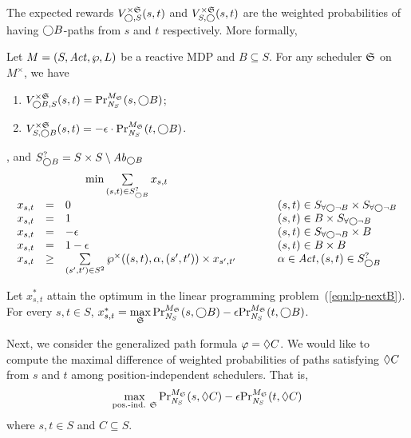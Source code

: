 The expected rewards ${V}_{\gX, S}^{\times\scheduler{S}} (s, t)$ and
${V}_{S, \gX}^{\times\scheduler{S}} (s, t)$ are the weighted
probabilities of having $\gX B$-paths from $s$ and $t$
respectively. More formally,
\begin{proposition}
  \label{proposition:joint-probabilities}
  Let $M = (S, \Act, \wp, L)$ be a reactive MDP and $B \subseteq S$.
  For any scheduler $\scheduler{S}$ on $M^{\times}$, we have
  \begin{enumerate}
  \item ${V}_{\gX B, S}^{\times\scheduler{S}} (s, t) = 
    \myPr{s}{M_{\scheduler{S}}}{\neighbor{S}}{\gX B}$;
  \item ${V}_{S, \gX B}^{\times\scheduler{S}} (s, t) =  
    -\epsilon \cdot \myPr{t}{M_{\scheduler{S}}}{\neighbor{S}}{\gX B}$.
  \end{enumerate}
\end{proposition}

, and $S^{?}_{\gX B} = S
\times S \setminus \mathit{Ab}_{\gX B}$
\begin{eqnarray}
  \label{eqn:lp-nextB}
\begin{array}{rclll}
  \multicolumn{3}{c}{
  \min \sum\limits_{(s, t) \in {S}^{?}_{\gX B}} x_{s, t}
  }\\
  x_{s, t} & = & 0 & \hspace{.05\columnwidth} &
  (s, t) \in \nevernextB \times \nevernextB \\
  x_{s, t} & = & 1 && 
  (s, t) \in B \times \nevernextB\\
  x_{s, t} & = & - \epsilon &&
  (s, t) \in \nevernextB \times B\\
  x_{s, t} & = & 1 - \epsilon && 
  (s, t) \in B \times B\\
  x_{s, t} &\geq& 
  \sum\limits_{(s', t') \in {S}^{2}}
   \wp^{\times} ((s, t), \alpha, (s', t')) \times x_{s', t'} 
  &&
  \alpha \in \Act, (s, t) \in {S}^{?}_{\gX B}
\end{array}
\end{eqnarray}

\begin{theorem}
  Let $x^*_{s, t}$ attain the optimum in the linear programming
  problem~(\ref{eqn:lp-nextB}). For every $s, t \in S$, 
  $x^*_{s, t} = \max\limits_{\scheduler{S}}
  \myPr{s}{M_{\scheduler{S}}}{\neighbor{S}}{\gX B} - 
  \epsilon \myPr{t}{M_{\scheduler{S}}}{\neighbor{S}}{\gX B}$.  
  \label{theorem:nextC}
\end{theorem}

Next, we consider the generalized path formula $\varphi = \gF C$. We
would like to compute the maximal difference of weighted probabilities
of paths satisfying $\gF C$ from $s$ and $t$ among
position-independent schedulers. That is, 
\begin{eqnarray}
  \label{eqn:max-eventuallyC}
\max_{\textmd{pos.-ind. } \scheduler{S}} 
\myPr{s}{M_{\scheduler{S}}}{\neighbor{S}}{\gF C} -
\epsilon \myPr{t}{M_{\scheduler{S}}}{\neighbor{S}}{\gF C}
\end{eqnarray}
where $s, t \in S$ and $C \subseteq S$. 

